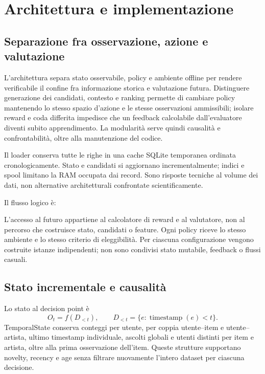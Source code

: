 \chapter{Architettura e implementazione}\label{ch:sistema}
\section{Separazione fra osservazione, azione e valutazione}
L'architettura separa stato osservabile, policy e ambiente offline per rendere verificabile il confine fra informazione storica e valutazione futura. Distinguere generazione dei candidati, contesto e ranking permette di cambiare policy mantenendo lo stesso spazio d'azione e le stesse osservazioni ammissibili; isolare reward e coda differita impedisce che un feedback calcolabile dall'evaluatore diventi subito apprendimento. La modularità serve quindi causalità e confrontabilità, oltre alla manutenzione del codice.

Il loader conserva tutte le righe in una cache SQLite temporanea ordinata cronologicamente. Stato e candidati si aggiornano incrementalmente; indici e spool limitano la RAM occupata dai record. Sono risposte tecniche al volume dei dati, non alternative architetturali confrontate scientificamente.

Il flusso logico è:
\begin{center}
\end{center}
L'accesso al futuro appartiene al calcolatore di reward e al valutatore, non al percorso che costruisce stato, candidati o feature. Ogni policy riceve lo stesso ambiente e lo stesso criterio di eleggibilità. Per ciascuna configurazione vengono costruite istanze indipendenti; non sono condivisi stato mutabile, feedback o flussi casuali.

\section{Stato incrementale e causalità}
Lo stato al decision point è
\begin{equation}
O_t=f(D_{<t}),\qquad D_{<t}=\{e:\operatorname{timestamp}(e)<t\}.\label{eq:state}
\end{equation}
TemporalState conserva conteggi per utente, per coppia utente--item e utente--artista, ultimo timestamp individuale, ascolti globali e utenti distinti per item e artista, oltre alla prima osservazione dell'item. Queste strutture supportano novelty, recency e age senza filtrare nuovamente l'intero dataset per ciascuna decisione.

